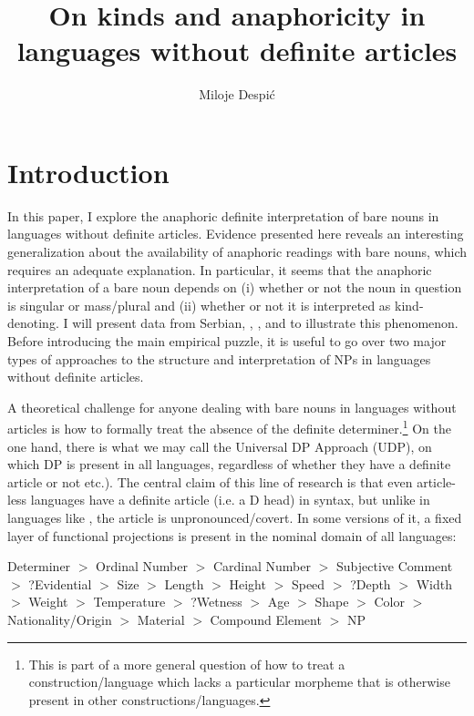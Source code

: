 \documentclass[output=paper,
modfonts
]{langscibook}
\title{On kinds and anaphoricity in languages without definite articles}
\author{Miloje Despić\affiliation{Cornell University}}
\begin{document}
	\maketitle
	\section{Introduction}
	In this paper, I explore the anaphoric definite interpretation of bare nouns in languages without definite articles. Evidence presented here reveals an interesting generalization about the availability of anaphoric readings with bare nouns, which requires an adequate explanation. In particular, it seems that the anaphoric interpretation of a bare noun depends on (i) whether or not the noun in question is singular or mass/plural and (ii) whether or not it is interpreted as kind-denoting. I will present data from Serbian, , ,  and  to illustrate this phenomenon. Before introducing the main empirical puzzle, it is useful to go over two major types of approaches to the structure and interpretation of NPs in languages without definite articles.
	
	A theoretical challenge for anyone dealing with bare nouns in languages without articles is how to formally treat the absence of the definite determiner.\footnote{This is part of a more general question of how to treat a construction/language which lacks a particular morpheme that is otherwise present in other constructions/languages.}  On the one hand, there is what we may call the Universal DP Approach (UDP), on which DP is present in all languages, regardless of whether they have a definite article or not  \citep[e.g.][]{Longobardi1994,Cinque1994,Scott2002,Pereltsvaig2007} etc.). The central claim of this line of research is that even article-less languages have a definite article (i.e. a D head) in syntax, but unlike in languages like , the article is unpronounced/covert. In some versions of it, a fixed layer of functional projections is present in the nominal domain of all languages:
	
	\ea \label{ex:despic:1} 
	{Determiner} $>$ {Ordinal Number} $>$ {Cardinal Number} $>$ {Subjective Comment} $>$ {?Evidential} $>$ {Size} $>$ {Length} $>$ {Height} $>$ {Speed} $>$ {?Depth} $>$ {Width} $>$ {Weight} $>$ {Temperature} $>$ {?Wetness} $>$ {Age} $>$ {Shape} $>$ {Color} $>$ {Nationality/Origin} $>$ {Material} $>$ {Compound Element} $>$ {NP}	\citep[114]{Scott2002} 
	\z
	
\end{document}
